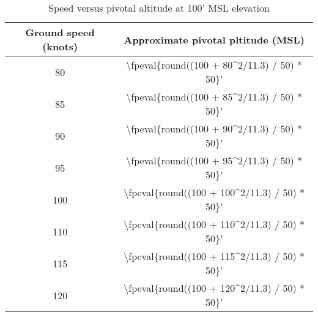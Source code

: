 {}

\begin{table}[H]
    \caption{Speed versus pivotal altitude at 100' MSL elevation}

    \begin{center}
        \begin{tabular}{cc}
            \toprule
            \textbf{Ground speed (knots)} & \textbf{Approximate pivotal pltitude (MSL)}         \\
            \midrule
            80                            & \num{\fpeval{round((100 + 80^2/11.3) / 50) * 50}}'  \\
            85                            & \num{\fpeval{round((100 + 85^2/11.3) / 50) * 50}}'  \\
            90                            & \num{\fpeval{round((100 + 90^2/11.3) / 50) * 50}}'  \\
            95                            & \num{\fpeval{round((100 + 95^2/11.3) / 50) * 50}}'  \\
            100                           & \num{\fpeval{round((100 + 100^2/11.3) / 50) * 50}}' \\
            110                           & \num{\fpeval{round((100 + 110^2/11.3) / 50) * 50}}' \\
            115                           & \num{\fpeval{round((100 + 115^2/11.3) / 50) * 50}}' \\
            120                           & \num{\fpeval{round((100 + 120^2/11.3) / 50) * 50}}' \\
            \bottomrule
        \end{tabular}
    \end{center}
\end{table}
